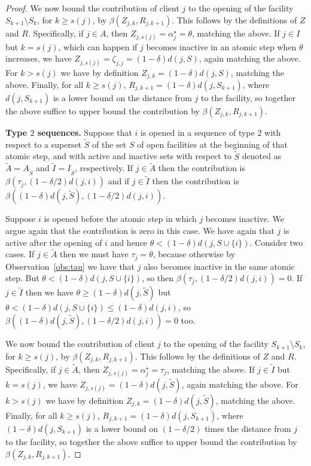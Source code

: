 \begin{proof}
    We now bound the contribution of client $j$ to the opening of the facility $S_{k+1} \setminus S_{k}$, for $k \geq s(j)$, by $\beta(Z_{j,k}, R_{j,k+1})$.
    This follows by the definitions of $Z$ and $R$.
    Specifically, if $j \in A$, then $Z_{j,s(j)} = \alpha^\star_j = \theta$, matching the above.
    If $j \in I$ but $k = s(j)$, which can happen if $j$ becomes inactive in an atomic step when $\theta$ increases, we have $Z_{j,s(j)} = \zeta_{j,j} = (1-\delta)d(j, S)$, again matching the above.
    For $k > s(j)$ we have by definition $Z_{j, k} = (1-\delta)d(j, S)$, matching the above.
    Finally, for all $k \geq s(j)$, $R_{j,k+1} = (1-\delta) d(j, S_{k+1})$, where $d(j, S_{k+1})$ is a lower bound on the distance from $j$ to the facility, so together the above suffice to upper bound the contribution by $\beta(Z_{j,k}, R_{j,k+1})$.

    \textbf{Type $2$ sequences.}
    Suppose that $i$ is opened in a sequence of type $2$ with respect to a superset $\tilde{S}$ of the set $S$ of open facilities at the beginning of that atomic step, and with active and inactive sets with respect to $\tilde{S}$ denoted as $\tilde{A} = A_{\tilde{S}}$ and $\tilde{I}=I_{\tilde{S}}$, respectively.
    If $j \in \tilde{A}$ then the contribution is $\beta(\tau_j, (1-\delta/2)d(j,i))$ and if $j \in \tilde{I}$ then the contribution is $\beta((1-\delta)d(j,\tilde S), (1-\delta/2) d(j, i))$.

    Suppose $i$ is opened before the atomic step in which $j$ becomes inactive.
    We argue again that the contribution is zero in this case.
    We have again that $j$ is active after the opening of $i$ and hence $\theta < (1-\delta) d(j, S \cup\{i\})$.
    Consider two cases.
    If $j \in \tilde{A}$ then we must have $\tau_j = \theta$, because otherwise by Observation~\ref{obs:tau} we have that $j$ also becomes inactive in the same atomic step.
    But $\theta < (1-\delta) d(j,S \cup \{i\})$, so then $\beta(\tau_j, (1-\delta/2)d(j,i))= 0$.
    If $j \in \tilde{I}$ then we have $\theta \geq (1-\delta)d(j,\tilde S)$ but $\theta < (1-\delta) d(j, S \cup \{i\}) \leq (1-\delta) d(j, i)$, so $\beta((1-\delta)d(j,\tilde S), (1-\delta/2) d(j, i)) = 0$ too.

    We now bound the contribution of client $j$ to the opening of the facility $S_{k+1} \setminus S_{k}$, for $k \geq s(j)$, by $\beta(Z_{j,k}, R_{j,k+1})$.
    This follows by the definitions of $Z$ and $R$.
    Specifically, if $j \in \tilde{A}$, then $Z_{j,s(j)} = \alpha_j^\star = \tau_j$, matching the above.
    If $j \in \tilde{I}$ but $k = s(j)$, we have $Z_{j,s(j)} = (1-\delta)d(j, \tilde{S})$, again matching the above.
    For $k > s(j)$ we have by definition $Z_{j, k} = (1-\delta)d(j, \tilde{S})$, matching the above.
    Finally, for all $k \geq s(j)$, $R_{j,k+1} = (1-\delta) d(j, S_{k+1})$, where $(1-\delta)d(j, S_{k+1})$ is a lower bound on $(1-\delta/2)$ times the distance from $j$ to the facility, so together the above suffice to upper bound the contribution by $\beta(Z_{j,k}, R_{j,k+1})$.


\end{proof}
